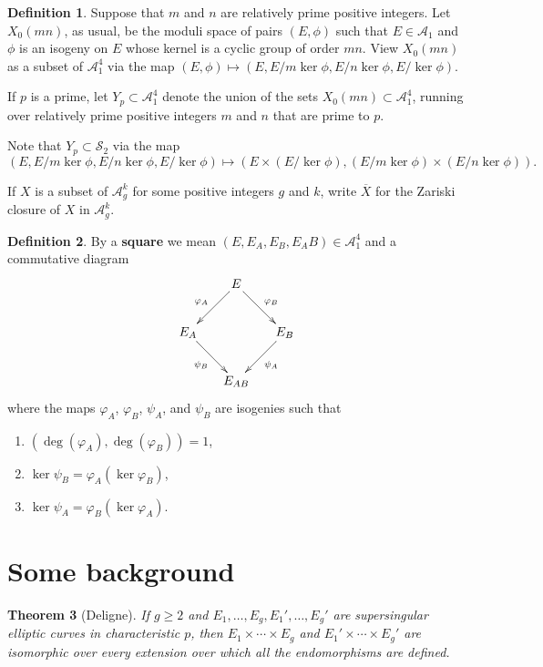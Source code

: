 \documentclass{amsart}
\def\SS{{\mathcal S}}
\def\AA{{\mathcal A}}
\numberwithin{equation}{section}
\newtheorem{thm}{Theorem}[section]
\theoremstyle{definition}
\newtheorem{defn}[thm]{Definition}
\begin{document}
\begin{defn}
Suppose that $m$ and $n$ are relatively prime positive integers.
Let $X_0(mn)$, as usual, be the moduli space of pairs $(E,\phi)$ such that $E \in \AA_1$
and $\phi$ is an isogeny on $E$ whose kernel is a cyclic group of order $mn$. 
View $X_0(mn)$ as a subset of $\AA_1^4$ via the map 
$(E,\phi) \mapsto (E,E/m\ker \phi,E/n\ker \phi,E/\ker \phi)$.

If $p$ is a prime, let $Y_p \subset \AA_1^4$ denote the union of the sets $X_0(mn) \subset \AA_1^4$, running over relatively prime positive integers $m$ and $n$ that are prime to $p$.
\end{defn}

Note that $Y_p \subset \SS_2$ via the map 
$$(E,E/m\ker \phi,E/n\ker \phi,E/\ker \phi) \mapsto (E \times (E/\ker \phi),(E/m\ker \phi) \times (E/n\ker \phi)).$$

If $X$ is a subset of $\AA_g^k$ for some positive integers $g$ and $k$, write $\overline{X}$ for the Zariski closure of $X$ in $\AA_g^k$.

\begin{defn}
By a {\bf square} we mean $(E,E_A,E_B,E_AB) \in \AA_1^4$ and a commutative diagram
$$
\xymatrix@C=15pt{
& E \ar[ld]_{\varphi_A}  \ar[rd]^{\varphi_B}  \\
E_A \ar[rd]_{\psi_B}  & &  \ar[ld]^{\psi_A} E_B \\
 & E_{AB}
}
$$
where  
the maps  
$\varphi_A$, $\varphi_B$, $\psi_A$, and $\psi_B$
are isogenies such that 
\begin{enumerate}
\item
$(\deg(\varphi_A),\deg(\varphi_B)) = 1$,
\item
$\ker \psi_B = \varphi_A(\ker \varphi_B)$,
\item
$\ker \psi_A = \varphi_B(\ker \varphi_A)$.
\end{enumerate}
\end{defn}



\section{Some background}

\begin{thm}[Deligne]
\label{DeligneSSthm}
If $g \ge 2$ and $E_1,\ldots,E_g,E_1',\ldots,E_g'$ are supersingular elliptic curves in characteristic $p$, then $E_1\times\cdots\times E_g$ and $E_1'\times\cdots\times E_g'$ are isomorphic over every extension over which all the endomorphisms are defined.
\end{thm}
\end{document}

